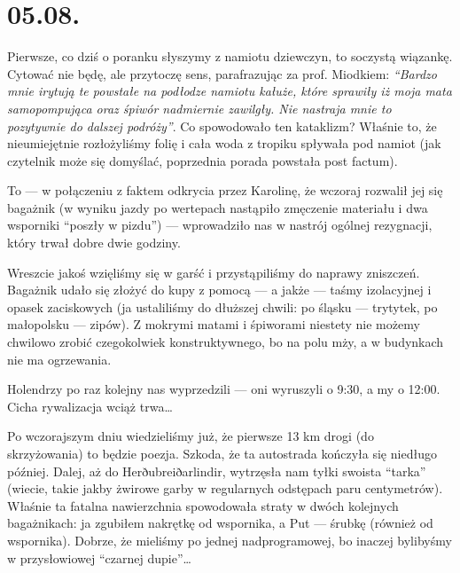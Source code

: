 \chapter*{05.08.}

Pierwsze, co dziś o poranku słyszymy z namiotu dziewczyn, to soczystą wiązankę. Cytować nie będę, ale przytoczę sens, parafrazując za prof. Miodkiem: \emph{“Bardzo mnie irytują te powstałe na podłodze namiotu kałuże, które sprawiły iż moja mata samopompująca oraz śpiwór nadmiernie zawilgły. Nie nastraja mnie to pozytywnie do dalszej podróży”}. Co spowodowało ten kataklizm? Właśnie to, że nieumiejętnie rozłożyliśmy folię i cała woda z tropiku spływała pod namiot (jak czytelnik może się domyślać, poprzednia porada powstała post factum).

To --- w połączeniu z faktem odkrycia przez Karolinę, że wczoraj rozwalił jej się bagażnik (w wyniku jazdy po wertepach nastąpiło zmęczenie materiału i dwa wsporniki “poszły w pizdu”) --- wprowadziło nas w nastrój ogólnej rezygnacji, który trwał dobre dwie godziny.

Wreszcie jakoś wzięliśmy się w garść i przystąpiliśmy do naprawy zniszczeń. Bagażnik udało się złożyć do kupy z pomocą --- a jakże --- taśmy izolacyjnej i opasek zaciskowych (ja ustaliliśmy do dłuższej chwili: po śląsku --- trytytek, po małopolsku --- zipów). Z mokrymi matami i śpiworami niestety nie możemy chwilowo zrobić czegokolwiek konstruktywnego, bo na polu mży, a w budynkach nie ma ogrzewania.

Holendrzy po raz kolejny nas wyprzedzili --- oni wyruszyli o 9:30, a my o 12:00. Cicha rywalizacja wciąż trwa…

Po wczorajszym dniu wiedzieliśmy już, że pierwsze 13 km drogi (do skrzyżowania) to będzie poezja. Szkoda, że ta autostrada kończyła się niedługo później. Dalej, aż do Herðubreiðarlindir, wytrzęsła nam tyłki swoista “tarka” (wiecie, takie jakby żwirowe garby w regularnych odstępach paru centymetrów). Właśnie ta fatalna nawierzchnia spowodowała straty w dwóch kolejnych bagażnikach: ja zgubiłem nakrętkę od wspornika, a Put --- śrubkę (również od wspornika). Dobrze, że mieliśmy po jednej nadprogramowej, bo inaczej bylibyśmy w przysłowiowej “czarnej dupie”…



